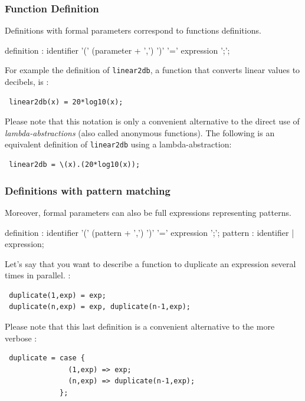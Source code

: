 \documentclass{article}
\begin{document}
\subsubsection{Function Definition}

Definitions with formal parameters correspond to functions definitions.

\begin{rail}
definition  : identifier '(' (parameter + ',')  ')' '=' expression ';';
\end{rail} 

For example the definition of \lstinline'linear2db', a function that converts linear values to decibels, is :

\begin{lstlisting}
 linear2db(x) = 20*log10(x);
\end{lstlisting}
 
Please note that this notation is only a convenient alternative to the direct use of \textit{lambda-abstractions} (also called anonymous functions). The following is an equivalent definition of \lstinline'linear2db' using a lambda-abstraction:

\begin{lstlisting}
 linear2db = \(x).(20*log10(x));
\end{lstlisting}


\subsubsection{Definitions with pattern matching}

Moreover, formal parameters can also be full expressions representing patterns. 
\begin{rail}
definition  : identifier '(' (pattern + ',')  ')' '=' expression ';';
pattern : identifier | expression; 
\end{rail}

Let's say that you want to describe a function to duplicate an expression several times in parallel.  :
\begin{lstlisting}
 duplicate(1,exp) = exp;
 duplicate(n,exp) = exp, duplicate(n-1,exp);
\end{lstlisting}

Please note that this last definition is a convenient alternative to the more verbose :
\begin{lstlisting}
 duplicate = case { 
               (1,exp) => exp; 
               (n,exp) => duplicate(n-1,exp); 
             };
\end{lstlisting}
\end{document}
